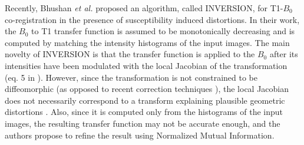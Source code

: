 Recently, Bhushan {\it et al.} \cite{Bhushan2015} proposed an algorithm, called INVERSION, for T1-$B_{0}$ co-registration in the presence of susceptibility induced distortions. In their work, the $B_0$ to T1 transfer function is assumed to be monotonically decreasing and is computed by matching the intensity histograms of the input images. The main novelty of INVERSION is that the transfer function is applied to the $B_0$ after its intensities have been modulated with the local Jacobian of the transformation (eq. 5 in \cite{Bhushan2015}). However, since the transformation is not constrained to be diffeomorphic (as opposed to recent correction techniques \cite{Ruthotto, Irfanoglu2015}), the local Jacobian does not necessarily correspond to a transform explaining plausible geometric distortions \cite{Chang1992}. Also, since it is computed only from the histograms of the input images, the resulting transfer function may not be accurate enough, and the authors propose to refine the result using Normalized Mutual Information.


\vspace{-0.2cm}
